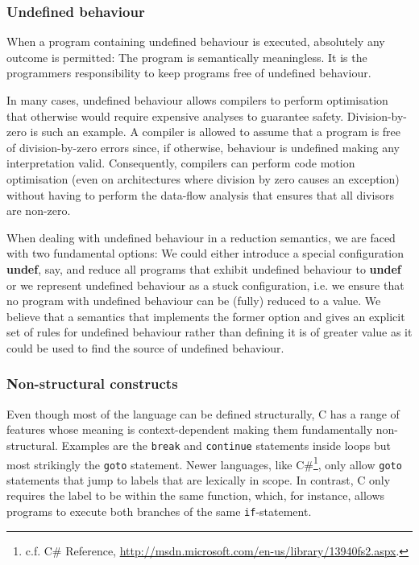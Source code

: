 \documentclass[a4paper,12pt]{scrbook}
\theoremstyle{plain}
\theoremstyle{definition}
\begin{document}
\subsubsection{Undefined behaviour}
When a program containing undefined behaviour is executed, absolutely any
outcome is permitted: The program is semantically meaningless. It is the
programmers responsibility to keep programs free of undefined behaviour.

In many cases, undefined behaviour allows compilers to perform optimisation that
otherwise would require expensive analyses to guarantee safety. Division-by-zero
is such an example.  A compiler is
allowed to assume that a program is free of division-by-zero errors since, if
otherwise, behaviour is undefined making any interpretation valid. Consequently,
compilers can perform code motion optimisation (even on architectures where
division by zero causes an exception) without having to perform the data-flow
analysis that ensures that all divisors are non-zero.

When dealing with undefined behaviour in a reduction semantics, we are faced
with two fundamental options: We could either introduce a special configuration
\textbf{undef}, say, and reduce all programs that exhibit undefined behaviour to
\textbf{undef} or we represent undefined behaviour as a stuck configuration,
i.e. we ensure that no program with undefined behaviour can be (fully) reduced
to a value. We believe that a semantics that implements the former option and
gives an explicit set of rules for undefined behaviour rather than defining it
 \cite[chapter 4,
§2]{c1x} is of greater value as it could be used to find the source of undefined
behaviour.

\subsubsection{Non-structural constructs}
Even though most of the language can be defined structurally, C has a range of
features whose meaning is context-dependent making them fundamentally
non-structural. Examples are the \lstinline{break} and \lstinline{continue}
statements inside loops but most strikingly the \lstinline{goto}
statement. Newer languages, like C\#\footnote{c.f. C\# Reference,
  \url{http://msdn.microsoft.com/en-us/library/13940fs2.aspx}.}, only allow
\lstinline{goto} statements that jump to labels that are lexically in scope. In
contrast, C only requires the label to be within the same function, which, for
instance, allows programs to execute both branches of the same
\lstinline{if}-statement.

\end{document}
